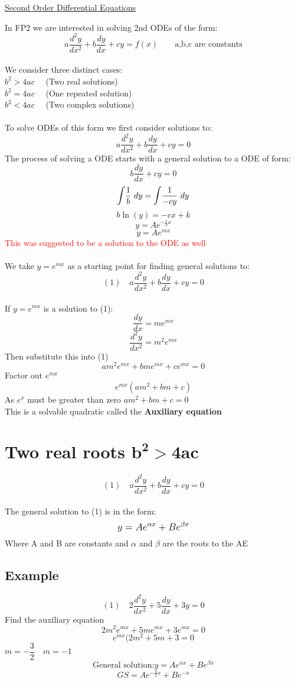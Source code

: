 \documentclass{article}[18pt]
\begin{document}
\begin{center}
\underline{\huge Second Order Differential Equations}
\end{center}
In FP2 we are interested in solving 2nd ODEs of the form:
$$a\frac{d^2y}{dx^2}+b\frac{dy}{dx}+cy=f(x) \quad \quad \textrm{a,b,c are constants}$$
\\
We consider three distinct cases:\\
$b^2>4ac\quad$  (Two real solutions)\\
$b^2=4ac\quad$  (One repeated solution)\\
$b^2<4ac\quad$  (Two complex solutions)\\
\\
To solve  ODEs of this form we first consider solutions to:
$$a\frac{d^2y}{dx^2}+b\frac{dy}{dx}+cy=0$$
The process of solving a  ODE starts with a general solution to a  ODE of form:
$$b\frac{dy}{dx}+cy=0$$
$$\mathlarger{\int}\frac{1}{b} \ dy=\mathlarger{\int}\frac{1}{-cy} \ dy$$
$$b\ln(y)=-cx+k$$
$$y=Ae^{-\frac{c}{b}x}$$
$$y=Ae^{mx}$$
\textcolor{red}{This was suggested to be a solution to the  ODE as well}\\
\\
We take $y=e^{mx}$ as a starting point for finding general solutions to:
$$(1) \quad a\frac{d^2y}{dx^2}+b\frac{dy}{dx}+cy=0$$\\
If $y=e^{mx}$ is a solution to (1):
$$\frac{dy}{dx}=me^{mx}$$
$$\frac{d^2y}{dx^2}=m^2e^{mx}$$
Then substitute this into (1)
$$am^2e^{mx}+bme^{mx}+ce^{mx}=0$$
Factor out $e^{mx}$
$$e^{mx}(am^2+bm+c)$$
As $e^x$ must be greater than zero $am^2+bm+c=0$\\
This is a solvable quadratic called the \textbf{Auxiliary equation}
\newpage
\section{Two real roots $\mathbf{b^2>4ac}$}
$$(1) \quad a\frac{d^2y}{dx^2}+b\frac{dy}{dx}+cy=0$$\\
The general solution to (1) is in the form:
$$\mathlarger{y=Ae^{\alpha x}+Be^{\beta x}}$$
Where A and B are constants and $\alpha$ and $\beta$ are the roots to the AE
\subsection{Example}
$$(1) \quad 2\frac{d^2y}{dx^2}+5\frac{dy}{dx}+3y=0$$
Find the auxiliary equation
$$2m^2e^{mx}+5me^{mx}+3e^{mx}=0$$
$$e^{mx}(2m^2+5m+3=0$$
$m=-\dfrac{3}{2}\quad m=-1$
$$\textrm{General solution:} y=Ae^{\alpha x}+Be^{\beta x}$$
$$GS=Ae^{-\frac{3}{2}x}+Be^{-x}$$
\end{document}
